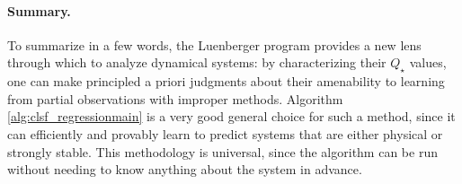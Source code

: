 \documentclass[11pt]{article}
\def\R{{\mathcal R}}
\def\R{\ensuremath{\mathcal R}}
\numberwithin{equation}{section}
\begin{document}
\paragraph{Summary.}
To summarize in a few words, the Luenberger program provides a new lens through which to analyze dynamical systems: by characterizing their $Q_\star$ values, one can make principled a priori judgments about their amenability to learning from partial observations with improper methods. Algorithm \ref{alg:clsf_regressionmain} is a very good general choice for such a method, since it can efficiently and provably learn to predict systems that are either physical or strongly stable. This methodology is universal, since the algorithm can be run without needing to know anything about the system in advance. 




\end{document}
